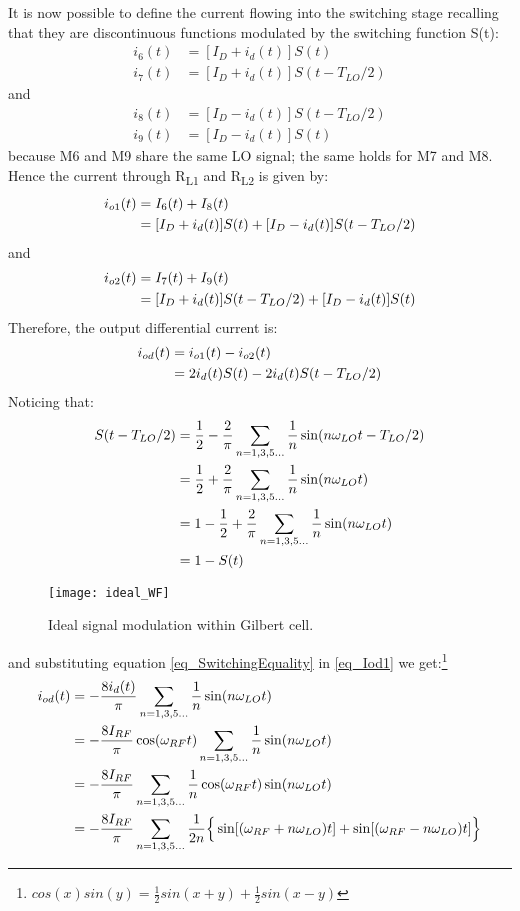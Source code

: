 It is now possible to define the current flowing into the switching stage recalling that they are discontinuous functions modulated by the switching function S(t):
\begin{align}
 i_6(t) &= [I_D + i_d(t)]S(t) \\
 i_7(t) &= [I_D + i_d(t)]S(t-T_{LO}/2)
\end{align}
and 
\begin{align}
i_8(t) &= [I_D - i_d(t)]S(t-T_{LO}/2) \\
i_9(t) &= [I_D - i_d(t)]S(t)
\end{align}
because M6 and M9 share the same LO signal; the same holds for M7 and M8. 
Hence the current through R\textsubscript{L1} and R\textsubscript{L2} is given by:
\begin{align}
i_{o1}(t) &= I_6(t)+I_8(t) \notag \\
&=[I_D + i_d(t)]S(t)+[I_D - i_d(t)]S(t-T_{LO}/2) 
\end{align}
and 
\begin{align}
i_{o2}(t) &= I_7(t)+I_9(t) \notag \\
&=[I_D + i_d(t)]S(t-T_{LO}/2)+[I_D - i_d(t)]S(t) 
\end{align}
Therefore, the output differential current is:
\begin{align}
\label{eq_Iod1}
i_{od}(t) &= i_{o1}(t)-i_{o2}(t) \notag \\
&=2i_d(t) S(t)-2i_d(t)S(t-T_{LO}/2) 
\end{align}
Noticing that:
\begin{align}
\label{eq_SwitchingEquality}
S(t-T_{LO}/2) &=\frac{1}{2}-\frac{2}{\pi} \sum_{n=1,3,5 \dots}^{} \frac{1}{n}\sin(n\omega_{LO} t-T_{LO}/2) \notag \\
&= \frac{1}{2}+\frac{2}{\pi} \sum_{n=1,3,5 \dots}^{} \frac{1}{n}\sin(n\omega_{LO} t) \notag \\
& =1- \frac{1}{2}+\frac{2}{\pi} \sum_{n=1,3,5 \dots}^{} \frac{1}{n}\sin(n\omega_{LO} t) \notag \\
&= 1 - S(t)
\end{align}
\begin{figure}[H]
	\centering
	\texttt{[image: ideal\_WF]}
	\caption{Ideal signal modulation within Gilbert cell.}
	\label{ideal_WF}
\end{figure}
and substituting equation \ref{eq_SwitchingEquality} in \ref{eq_Iod1} we get:\footnote{$cos(x)sin(y)=\frac{1}{2}sin(x+y)+\frac{1}{2}sin(x-y)$}
\begin{align}
\label{eq_Iod2}
i_{od}(t) &= -\frac{8i_d(t)}{\pi}\sum_{n=1,3,5 \dots}^{} \frac{1}{n}\sin(n\omega_{LO} t) \notag \\
&= -\frac{8I_{RF}}{\pi}\cos(\omega_{RF}t)\sum_{n=1,3,5 \dots}^{} \frac{1}{n}\sin(n\omega_{LO} t) \notag \\
&= -\frac{8I_{RF}}{\pi}\sum_{n=1,3,5 \dots}^{} \frac{1}{n}\cos(\omega_{RF}t)\sin(n\omega_{LO} t) \notag \\
&= -\frac{8I_{RF}}{\pi}\sum_{n=1,3,5 \dots}^{} \frac{1}{2n}\Big\{ \sin[(\omega_{RF}+n\omega_{LO})t]+\sin[(\omega_{RF}-n\omega_{LO}) t]\Big\}
\end{align}
